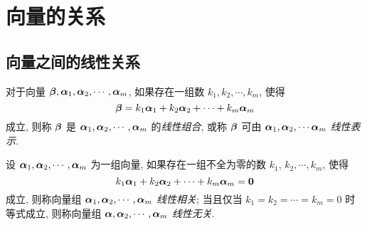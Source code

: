 \section{向量的关系}

\subsection{向量之间的线性关系}

\begin{definition}[线性表示]
    对于向量 $\vb*{\beta},\vb*{\alpha}_1,\vb*{\alpha}_2,\cdots,\vb*{\alpha}_m$, 如果存在一组数 $k_1,k_2,\cdots, k_m$, 使得
    $$\vb*{\beta}=k_{1} \vb*{\alpha}_{1}+k_{2} \vb*{\alpha}_{2}+\cdots+k_{m} \vb*{\alpha}_{m}$$
    成立, 则称 $ \vb*{\beta} $ 是 $ \vb*{\alpha}_{1}, \vb*{\alpha}_{2}, \cdots, \vb*{\alpha}_{m} $ 的\textit{线性组合}, 或称 $ \vb*{\beta} $ 可由 $ \vb*{\alpha}_{1}, \vb*{\alpha}_{2}, \cdots \vb*{\alpha}_{m} $ \textit{线性表示}.
\end{definition}

\begin{definition}[线性相关与线性无关]
    设 $ \vb*{\alpha}_{1}, \vb*{\alpha}_{2}, \cdots, \vb*{\alpha}_{m} $ 为一组向量, 如果存在一组不全为零的数 $ k_{1}$, $k_{2}, \cdots, k_{m} $, 使得
    $$k_{1} \vb*{\alpha}_{1}+k_{2} \vb*{\alpha}_{2}+\cdots+k_{m} \vb*{\alpha}_{m}=\mathbf{0}$$
    成立, 则称向量组 $ \vb*{\alpha}_{1}, \vb*{\alpha}_{2}, \cdots, \vb*{\alpha}_{m} $ \textit{线性相关}; 当且仅当  $k_{1}=k_{2}=\cdots=k_{m}=0 $ 时等式成立, 则称向量组 $ \vb*{\alpha}, \vb*{\alpha}_{2}, \cdots, \vb*{\alpha}_{m} $ \textit{线性无关}.
\end{definition}

